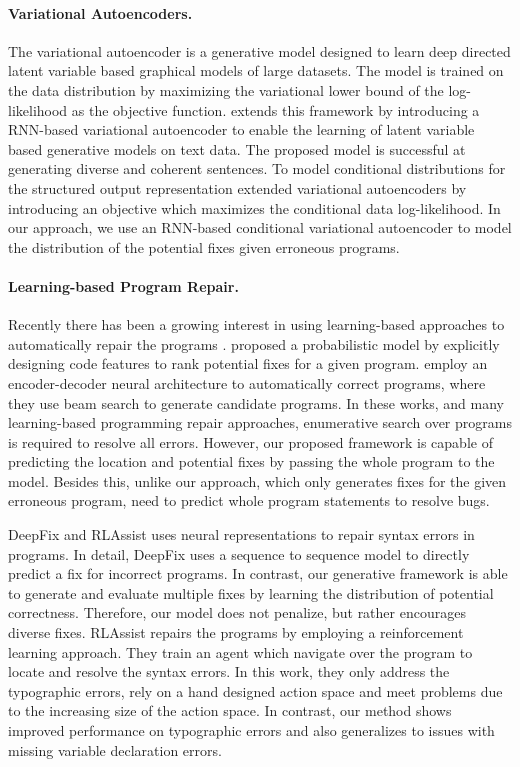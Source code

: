 \documentclass[letterpaper]{article} \usepackage{aaai20}  \usepackage{times}  \usepackage{helvet} \usepackage{courier}  \usepackage[hyphens]{url}  \usepackage{graphicx}
\begin{document}
\paragraph{Variational Autoencoders.}
\label{rw_variational_autoencoder}
The variational autoencoder \cite{autoencodr14kingma,variational15rezende} is a generative model designed to learn deep directed latent variable based graphical models of large datasets. The model is trained on the data distribution by maximizing the variational lower bound of the log-likelihood as the objective function. \citeauthor{gensen16bowman} extends this framework by introducing a RNN-based variational autoencoder to enable the learning of latent variable based generative models on text data. The proposed model is successful at generating diverse and coherent sentences. To model conditional distributions for the structured output representation \citeauthor{cvae15sohn} extended variational autoencoders by introducing an objective which maximizes the conditional data log-likelihood. In our approach, we use an RNN-based conditional variational autoencoder to model the distribution of the potential fixes given erroneous programs. 
\paragraph{Learning-based Program Repair.}
\label{rw_program_repair}
Recently there has been a growing interest in using learning-based approaches to automatically repair the programs \cite{monperrus2018automatic}. \citeauthor{long2016automatic} proposed a probabilistic model by explicitly designing code features to rank potential fixes for a given program. \citeauthor{pu2016sk_p} employ an encoder-decoder neural architecture to automatically correct programs, where they use beam search to generate candidate programs. In these works, and many learning-based programming repair approaches, enumerative search over programs is required to resolve all errors. However, our proposed framework is capable of predicting the location and potential fixes by passing the whole program to the model. Besides this, unlike our approach, which only generates fixes for the given erroneous program, \citeauthor{pu2016sk_p} need to predict whole program statements to resolve bugs.


DeepFix \cite{Gupta2017DeepFixFC} and RLAssist \cite{gupta2019RLAssist} uses neural representations to repair syntax errors in programs. In detail, DeepFix uses a sequence to sequence model to directly predict a fix for incorrect programs. In contrast, our generative framework is able to generate and evaluate multiple fixes by learning the distribution of potential correctness. Therefore, our model does not penalize, but rather encourages diverse fixes. RLAssist repairs the programs by employing a reinforcement learning approach. They train an agent which navigate over the program to locate and resolve the syntax errors. In this work, they only address the typographic errors, rely on a hand designed action space and meet problems due to the increasing size of the action space. In contrast, our method shows improved performance on typographic errors and also generalizes to issues with missing variable declaration errors. 
\end{document}

